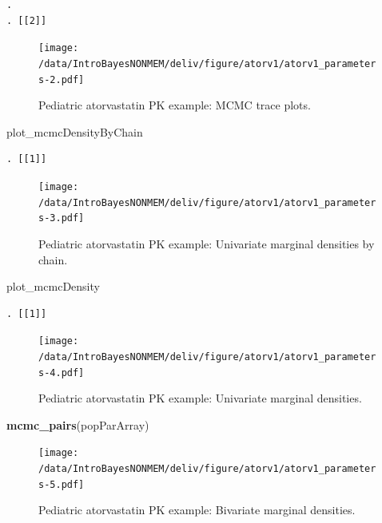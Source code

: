 \documentclass[]{article}
\newenvironment{Shaded}{\begin{snugshade}}{\end{snugshade}}
\newcommand{\KeywordTok}[1]{\textcolor[rgb]{0.13,0.29,0.53}{\textbf{{#1}}}}
\newcommand{\NormalTok}[1]{{#1}}
\begin{document}
\begin{verbatim}
. 
. [[2]]
\end{verbatim}

\begin{figure}[htbp]
\centering
\texttt{[image: /data/IntroBayesNONMEM/deliv/figure/atorv1/atorv1\_parameters-2.pdf]}
\caption{Pediatric atorvastatin PK example: MCMC trace plots.}
\end{figure}

\begin{Shaded}
\begin{Highlighting}[]
\NormalTok{plot_mcmcDensityByChain}
\end{Highlighting}
\end{Shaded}

\begin{verbatim}
. [[1]]
\end{verbatim}

\begin{figure}[htbp]
\centering
\texttt{[image: /data/IntroBayesNONMEM/deliv/figure/atorv1/atorv1\_parameters-3.pdf]}
\caption{Pediatric atorvastatin PK example: Univariate marginal
densities by chain.}
\end{figure}

\begin{Shaded}
\begin{Highlighting}[]
\NormalTok{plot_mcmcDensity}
\end{Highlighting}
\end{Shaded}

\begin{verbatim}
. [[1]]
\end{verbatim}

\begin{figure}[htbp]
\centering
\texttt{[image: /data/IntroBayesNONMEM/deliv/figure/atorv1/atorv1\_parameters-4.pdf]}
\caption{Pediatric atorvastatin PK example: Univariate marginal
densities.}
\end{figure}

\begin{Shaded}
\begin{Highlighting}[]
\KeywordTok{mcmc_pairs}\NormalTok{(popParArray)}
\end{Highlighting}
\end{Shaded}

\begin{figure}[htbp]
\centering
\texttt{[image: /data/IntroBayesNONMEM/deliv/figure/atorv1/atorv1\_parameters-5.pdf]}
\caption{Pediatric atorvastatin PK example: Bivariate marginal
densities.}
\end{figure}
\end{document}
